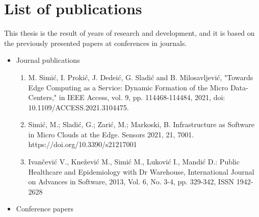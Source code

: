 \chapter*{List of publications}
%
This thesis is the result of years of research and development, and it is based on the previously presented papers at conferences in journals.

\begin{itemize}
	
	\item Journal publications
	
	\begin{enumerate}[start=1,label={(\bfseries \arabic*)}]
		\item M. Simić, I. Prokić, J. Dedeić, G. Sladić and B. Milosavljević, "Towards Edge Computing as a Service: Dynamic Formation of the Micro Data-Centers," in IEEE Access, vol. 9, pp. 114468-114484, 2021, doi: 10.1109/ACCESS.2021.3104475. \label{accessSimic}
		\item Simić, M.; Sladić, G.; Zarić, M.; Markoski, B. Infrastructure as Software in Micro Clouds at the Edge. Sensors 2021, 21, 7001. https://doi.org/10.3390/s21217001
		\item  Ivančević V., Knežević M., Simić M., Luković I., Mandić D.:  Public Healthcare and Epidemiology with Dr Warehouse, International Journal on Advances in Software, 2013, Vol. 6, No. 3-4, pp. 329-342, ISSN 1942-2628
	\end{enumerate}
	
	\item Conference papers
	

\end{itemize}
